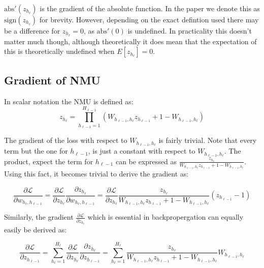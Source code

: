 $\mathrm{abs}'(z_{h_{\ell}})$ is the gradient of the absolute function. In the paper we denote this as $\mathrm{sign}(z_{h_{\ell}})$ for brevity. However, depending on the exact defintion used there may be a difference for $z_{h_{\ell}} = 0$, as $\mathrm{abs}'(0)$ is undefined. In practicality this doesn't matter much though, although theoretically it does mean that the expectation of this is theoretically undefined when $E[z_{h_{\ell}}] = 0$.

\subsection{Gradient of NMU}
\label{sec:appendix:gradient-derivatives:gradient-nmu}

In scalar notation the NMU is defined as:
\begin{equation}
z_{h_\ell} = \prod_{h_{\ell-1}=1}^{H_{\ell-1}} \left(W_{h_{\ell-1},h_\ell} z_{h_{\ell-1}} + 1 - W_{h_{\ell-1},h_\ell} \right)
\end{equation}

The gradient of the loss with respect to $W_{h_{\ell-1},h_\ell}$ is fairly trivial. Note that every term but the one for $h_{\ell-1}$, is just a constant with respect to $W_{h_{\ell-1},h_\ell}$. The product, expect the term for $h_{\ell-1}$ can be expressed as $\frac{z_{h_\ell}}{W_{h_{\ell-1},h_\ell} z_{h_{\ell-1}} + 1 - W_{h_{\ell-1},h_\ell}}$. Using this fact, it becomes trivial to derive the gradient as:

\begin{equation}
\frac{\partial \mathcal{L}}{\partial w_{h_{\ell}, h_{\ell - 1}}} = \frac{\partial \mathcal{L}}{\partial z_{h_\ell}} \frac{\partial z_{h_\ell}}{\partial w_{h_{\ell}, h_{\ell - 1}}} = \frac{\partial \mathcal{L}}{\partial z_{h_\ell}} \frac{z_{h_\ell}}{W_{h_{\ell-1},h_\ell} z_{h_{\ell-1}} + 1 - W_{h_{\ell-1},h_\ell}} \left(z_{h_{\ell-1}} - 1\right)
\end{equation}

Similarly, the gradient $\frac{\partial \mathcal{L}}{\partial z_{h_\ell}}$ which is essential in backpropergation can equally easily be derived as:

\begin{equation}
\frac{\partial \mathcal{L}}{\partial z_{h_{\ell-1}}} = \sum_{h_\ell = 1}^{H_\ell} \frac{\partial \mathcal{L}}{\partial z_{h_\ell}} \frac{\partial z_{h_\ell}}{\partial z_{h_{\ell-1}}} = \sum_{h_\ell = 1}^{H_\ell} \frac{z_{h_\ell}}{W_{h_{\ell-1},h_\ell} z_{h_{\ell-1}} + 1 - W_{h_{\ell-1},h_\ell}} W_{h_{\ell-1},h_\ell}
\end{equation}
